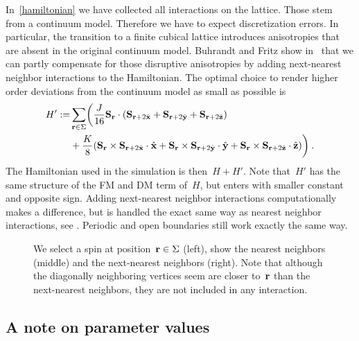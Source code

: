 In~\eqref{hamiltonian} we have collected all interactions on the lattice. Those
stem from a continuum model. Therefore we have to expect discretization errors.
In particular, the transition to a finite cubical lattice introduces
anisotropies that are absent in the original continuum model. Buhrandt and Fritz
show in~\cite{skyrmionlattice} that we can partly compensate for those
disruptive anisotropies by adding next-nearest neighbor interactions to the
Hamiltonian. The optimal choice to render higher order deviations from the
continuum model as small as possible is
%
\begin{align}\label{hamiltonianfull}
  H' := & \sum_{\mathbf{r} \in \Sigma} \biggl(
  \frac{J}{16} \mathbf{S}_{\mathbf{r}} \cdot (\mathbf{S}_{\mathbf{r}+2\hat{\mathbf{x}}} + \mathbf{S}_{\mathbf{r}+2\hat{\mathbf{y}}} + \mathbf{S}_{\mathbf{r}+2\hat{\mathbf{z}}}) \\
  &+ \frac{K}{8} (\mathbf{S}_{\mathbf{r}} \times \mathbf{S}_{\mathbf{r}+2\hat{\mathbf{x}}} \cdot \hat{\mathbf{x}} +
        \mathbf{S}_{\mathbf{r}} \times \mathbf{S}_{\mathbf{r}+2\hat{\mathbf{y}}} \cdot \hat{\mathbf{y}} +
        \mathbf{S}_{\mathbf{r}} \times \mathbf{S}_{\mathbf{r}+2\hat{\mathbf{z}}} \cdot \hat{\mathbf{z}})\biggr)\:.
\end{align}
%
The Hamiltonian used in the simulation is then~$H + H'$. Note that~$H'$ has the
same structure of the FM and DM term of~$H$, but enters with smaller constant
and opposite sign. Adding next-nearest neighbor interactions computationally
makes a difference, but is handled the exact same way as nearest neighbor
interactions, see . Periodic and open boundaries still work
exactly the same way.

\begin{figure}
  \centering
  \caption{We select a spin at position~$\mathbf{r} \in \Sigma$ (left), show the nearest
  neighbors (middle) and the next-nearest neighbors (right). Note that although
  the diagonally neighboring vertices seem are closer to~$\mathbf{r}$ than the
  next-nearest neighbors, they are not included in any interaction.}
\label{fig:interact}
\end{figure}

\subsection{A note on parameter values}

